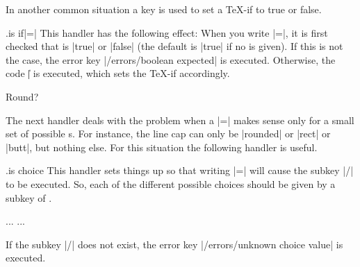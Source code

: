 
In another common situation a key is used to set a \TeX-if to true or false.

\begin{handler}{{.is if}|=|}
    This handler has the following effect: When you write
    |=|, it is first checked that  is |true|
    or |false| (the default is |true| if no  is given). If this is
    not the case, the error key |/errors/boolean expected| is executed.
    Otherwise, the code |\| is executed, which
    sets the \TeX-if accordingly.
\begin{codeexample}[]
\newif\iftheworldisflat
{}
\iftheworldisflat
  Flat
\else
  Round?
\fi
\end{codeexample}
\end{handler}

The next handler deals with the problem when a |=| makes
sense only for a small set of possible s. For instance, the line
cap can only be |rounded| or |rect| or |butt|, but nothing else. For this
situation the following handler is useful.

\begin{handler}{{.is choice}}
    This handler sets things up so that writing |=| will
    cause the subkey |/| to be executed. So, each of the
    different possible choices should be given by a subkey of .
\begin{codeexample}
...
\draw [/line cap=butt] ...
\end{codeexample}
    If the subkey |/| does not exist, the error key
    |/errors/unknown choice value| is executed.
\end{handler}



